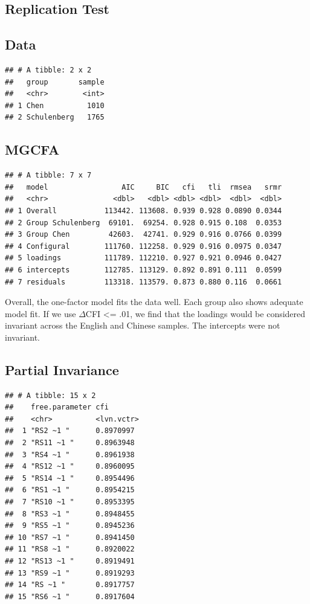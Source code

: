 \documentclass[
  man,floatsintext]{apa7}
\begin{document}
\subsection{Replication Test}\label{replication-test}

\subsection{Data}\label{data}

\begin{verbatim}
## # A tibble: 2 x 2
##   group       sample
##   <chr>        <int>
## 1 Chen          1010
## 2 Schulenberg   1765
\end{verbatim}

\subsection{MGCFA}\label{mgcfa-1}

\begin{verbatim}
## # A tibble: 7 x 7
##   model                 AIC     BIC   cfi   tli  rmsea   srmr
##   <chr>               <dbl>   <dbl> <dbl> <dbl>  <dbl>  <dbl>
## 1 Overall           113442. 113608. 0.939 0.928 0.0890 0.0344
## 2 Group Schulenberg  69101.  69254. 0.928 0.915 0.108  0.0353
## 3 Group Chen         42603.  42741. 0.929 0.916 0.0766 0.0399
## 4 Configural        111760. 112258. 0.929 0.916 0.0975 0.0347
## 5 loadings          111789. 112210. 0.927 0.921 0.0946 0.0427
## 6 intercepts        112785. 113129. 0.892 0.891 0.111  0.0599
## 7 residuals         113318. 113579. 0.873 0.880 0.116  0.0661
\end{verbatim}

Overall, the one-factor model fits the data well. Each group also shows adequate model fit. If we use \(\Delta\)CFI \textless= .01, we find that the loadings would be considered invariant across the English and Chinese samples. The intercepts were not invariant.

\subsection{Partial Invariance}\label{partial-invariance-1}

\begin{verbatim}
## # A tibble: 15 x 2
##    free.parameter cfi       
##    <chr>          <lvn.vctr>
##  1 "RS2 ~1 "      0.8970997 
##  2 "RS11 ~1 "     0.8963948 
##  3 "RS4 ~1 "      0.8961938 
##  4 "RS12 ~1 "     0.8960095 
##  5 "RS14 ~1 "     0.8954496 
##  6 "RS1 ~1 "      0.8954215 
##  7 "RS10 ~1 "     0.8953395 
##  8 "RS3 ~1 "      0.8948455 
##  9 "RS5 ~1 "      0.8945236 
## 10 "RS7 ~1 "      0.8941450 
## 11 "RS8 ~1 "      0.8920022 
## 12 "RS13 ~1 "     0.8919491 
## 13 "RS9 ~1 "      0.8919293 
## 14 "RS ~1 "       0.8917757 
## 15 "RS6 ~1 "      0.8917604
\end{verbatim}
\end{document}
